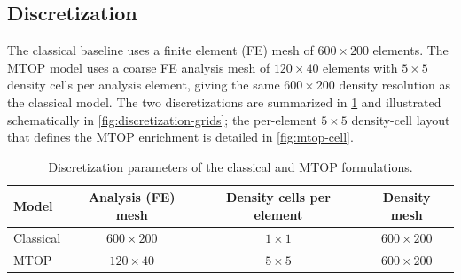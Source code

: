 \documentclass[11pt,a4paper]{article}
\begin{document}
\subsection{Discretization}

The classical baseline uses a finite element (FE) mesh of $600\times 200$ elements. The MTOP model uses a coarse FE analysis mesh of $120\times 40$ elements with $5\times 5$ density cells per analysis element, giving the same $600\times 200$ density resolution as the classical model. The two discretizations are summarized in \cref{tab:discretization} and illustrated schematically in \cref{fig:discretization-grids}; the per-element $5\times 5$ density-cell layout that defines the MTOP enrichment is detailed in \cref{fig:mtop-cell}.

\begin{table}[htbp]
  \centering
  \caption{Discretization parameters of the classical and MTOP formulations.}
  \label{tab:discretization}
  \begin{tabular}{lccc}
    \toprule
    Model & Analysis (FE) mesh & Density cells per element & Density mesh \\
    \midrule
    Classical & $600 \times 200$ & $1 \times 1$ & $600 \times 200$ \\
    MTOP & $120 \times 40$ & $5 \times 5$ & $600 \times 200$ \\
    \bottomrule
  \end{tabular}
\end{table}
\end{document}

